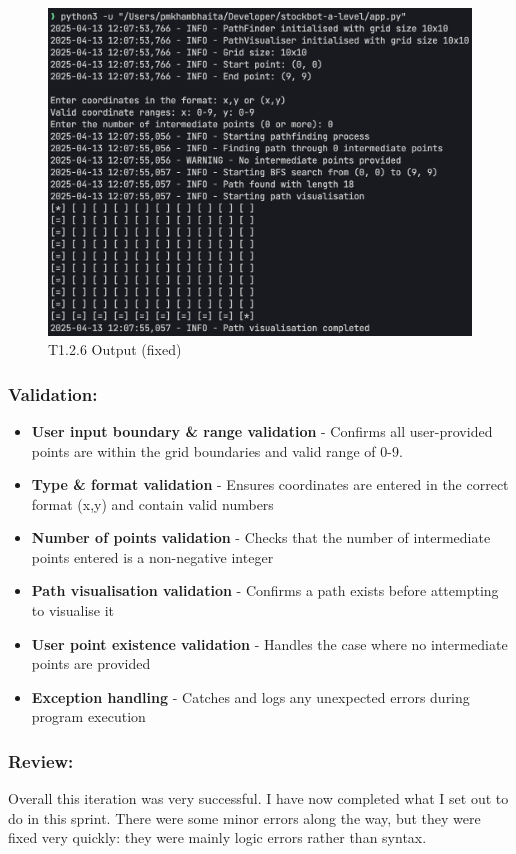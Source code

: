 \begin{figure}[htbp!]
    \centering
    \includegraphics[width=0.5\linewidth]{Images/t1.2.1.png}
    \caption{T1.2.6 Output (fixed)}
    \label{fig:enter-label}
\end{figure}

\newpage

\subsubsection{Validation:}
\begin{itemize}
    \item \textbf{User input boundary \& range validation} - Confirms all user-provided points are within the grid boundaries and valid range of 0-9.
    \item \textbf{Type \& format validation} - Ensures coordinates are entered in the correct format (x,y) and contain valid numbers
    \item \textbf{Number of points validation} - Checks that the number of intermediate points entered is a non-negative integer
    \item \textbf{Path visualisation validation} - Confirms a path exists before attempting to visualise it
    \item \textbf{User point existence validation} - Handles the case where no intermediate points are provided
    \item \textbf{Exception handling} - Catches and logs any unexpected errors during program execution
\end{itemize}

\subsubsection{Review:}
 Overall this iteration was very successful. I have now completed what I set out to do in this sprint. There were some minor errors along the way, but they were fixed very quickly: they were mainly logic errors rather than syntax.

